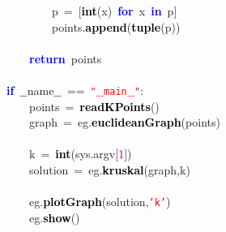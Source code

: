 \mbox{}\ \ \ \ \ \ \ \ p\ \textcolor{BrickRed}{=}\ \textcolor{BrickRed}{[}\textbf{\textcolor{Black}{int}}\textcolor{BrickRed}{(}x\textcolor{BrickRed}{)}\ \textbf{\textcolor{Blue}{for}}\ x\ \textbf{\textcolor{Blue}{in}}\ p\textcolor{BrickRed}{]} \\
\mbox{}\ \ \ \ \ \ \ \ points\textcolor{BrickRed}{.}\textbf{\textcolor{Black}{append}}\textcolor{BrickRed}{(}\textbf{\textcolor{Black}{tuple}}\textcolor{BrickRed}{(}p\textcolor{BrickRed}{))} \\
\mbox{} \\
\mbox{}\ \ \ \ \textbf{\textcolor{Blue}{return}}\ points \\
\mbox{} \\
\mbox{}\textbf{\textcolor{Blue}{if}}\ $\_$$\_$name$\_$$\_$\ \textcolor{BrickRed}{==}\ \texttt{\textcolor{Red}{"{}$\_$$\_$main$\_$$\_$"{}}}\textcolor{BrickRed}{:} \\
\mbox{}\ \ \ \ points\ \textcolor{BrickRed}{=}\ \textbf{\textcolor{Black}{readKPoints}}\textcolor{BrickRed}{()} \\
\mbox{}\ \ \ \ graph\ \textcolor{BrickRed}{=}\ eg\textcolor{BrickRed}{.}\textbf{\textcolor{Black}{euclideanGraph}}\textcolor{BrickRed}{(}points\textcolor{BrickRed}{)} \\
\mbox{}\ \ \ \  \\
\mbox{}\ \ \ \ k\ \textcolor{BrickRed}{=}\ \textbf{\textcolor{Black}{int}}\textcolor{BrickRed}{(}sys\textcolor{BrickRed}{.}argv\textcolor{BrickRed}{[}\textcolor{Purple}{1}\textcolor{BrickRed}{])} \\
\mbox{}\ \ \ \ solution\ \textcolor{BrickRed}{=}\ eg\textcolor{BrickRed}{.}\textbf{\textcolor{Black}{kruskal}}\textcolor{BrickRed}{(}graph\textcolor{BrickRed}{,}k\textcolor{BrickRed}{)} \\
\mbox{} \\
\mbox{}\ \ \ \ eg\textcolor{BrickRed}{.}\textbf{\textcolor{Black}{plotGraph}}\textcolor{BrickRed}{(}solution\textcolor{BrickRed}{,}\texttt{\textcolor{Red}{'k'}}\textcolor{BrickRed}{)} \\
\mbox{}\ \ \ \ eg\textcolor{BrickRed}{.}\textbf{\textcolor{Black}{show}}\textcolor{BrickRed}{()} \\
\mbox{}\ \ \ \  \\
\mbox{}
